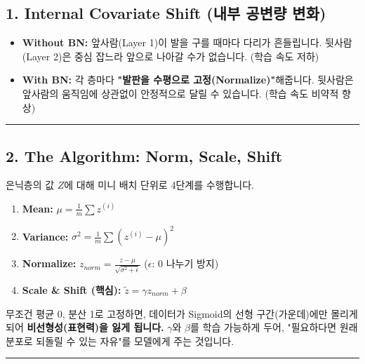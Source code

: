 \documentclass[11pt,a4paper]{book}
\theoremstyle{definition}
\begin{document}
\subsection{1. Internal Covariate Shift (내부 공변량 변화)}


\begin{analogybox}[title={흔들리는 다리 위에서 걷기}]
\begin{itemize}
    \item \textbf{Without BN:} 앞사람(Layer 1)이 발을 구를 때마다 다리가 흔들립니다. 뒷사람(Layer 2)은 중심 잡느라 앞으로 나아갈 수가 없습니다. (학습 속도 저하)
    \item \textbf{With BN:} 각 층마다 \textbf{"발판을 수평으로 고정(Normalize)"}해줍니다. 뒷사람은 앞사람의 움직임에 상관없이 안정적으로 달릴 수 있습니다. (학습 속도 비약적 향상)
\end{itemize}
\end{analogybox}

\vspace{0.5cm}\hrule\vspace{0.5cm}

\subsection{2. The Algorithm: Norm, Scale, Shift}
은닉층의 값 $Z$에 대해 미니 배치 단위로 4단계를 수행합니다.

\begin{enumerate}
    \item \textbf{Mean:} $\mu = \frac{1}{m} \sum z^{(i)}$
    \item \textbf{Variance:} $\sigma^2 = \frac{1}{m} \sum (z^{(i)} - \mu)^2$
    \item \textbf{Normalize:} $z_{norm} = \frac{z - \mu}{\sqrt{\sigma^2 + \epsilon}}$ \quad ($\epsilon$: 0 나누기 방지)
    \item \textbf{Scale \& Shift (핵심):} $\tilde{z} = \gamma z_{norm} + \beta$
\end{enumerate}

\begin{warningbox}[title={왜 다시 $\gamma, \beta$로 망가뜨리나요?}]
무조건 평균 0, 분산 1로 고정하면, 데이터가 Sigmoid의 선형 구간(가운데)에만 몰리게 되어 \textbf{비선형성(표현력)을 잃게 됩니다.}
$\gamma$와 $\beta$를 학습 가능하게 두어, "필요하다면 원래 분포로 되돌릴 수 있는 자유"를 모델에게 주는 것입니다.
\end{warningbox}

\vspace{0.5cm}\hrule\vspace{0.5cm}
\end{document}
